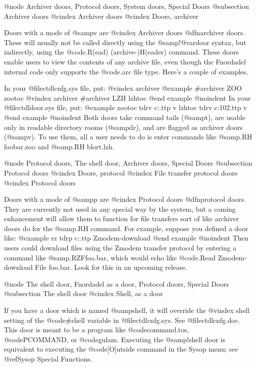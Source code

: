 {@node Archiver doors, Protocol doors, System doors, Special Doors
@subsection Archiver doors
@cindex Archiver doors
@cindex Doors, archiver

Doors with a mode of @samp{v} are
@cindex Archiver doors
@dfn{archiver} doors.  These will usually
not be called directly using the @samp{!@var{door}} syntax, but indirectly,
using the @code{.R(ead) (archive-)H(eader)} command.  These doors enable
users to view the contents of any archive file, even though the
Fnordadel internal code only supports the @code{.arc} file type.  Here's
a couple of examples.

In your @file{ctdlcnfg.sys} file, put:
@vindex archiver
@example
#archiver ZOO zootoc
@vindex archiver
#archiver LZH lzhtoc
@end example
@noindent
In your @file{ctdldoor.sys} file, put:
@example
zootoc  tdrv    c:\bin\zoo.ttp          v
lzhtoc  tdrv    c:\bin\lharc102.ttp     v
@end example
@noindent
Both doors take command tails (@samp{t}), are usable only in readable
directory rooms (@samp{dr}), and are flagged as archiver doors (@samp{v}).
To use them, all a user needs to do is enter commands like
@samp{.RH foobar.zoo} and @samp{.RH blort.lzh}.

@node Protocol doors, The shell door, Archiver doors, Special Doors
@subsection Protocol doors
@cindex Doors, protocol
@cindex File transfer protocol doors
@cindex Protocol doors

Doors with a mode of @samp{p} are
@cindex Protocol doors
@dfn{protocol} doors.  They are currently
not used in any special way by the system, but a coming enhancement
will allow them to function for file transfers sort of like archiver
doors do for the @samp{.RH} command.  For example, suppose you defined a
door like:
@example
rz      tdrp    c:\bin\rz.ttp   Zmodem-download
@end example
@noindent
Then users could download files using the Zmodem transfer protocol by
entering a command like @samp{.RZFfoo.bar}, which would echo like
@code{.Read Zmodem-download File foo.bar}.  Look
for this in an upcoming release.

@node The shell door, Fnordadel as a door, Protocol doors, Special Doors
@subsection The shell door
@cindex Shell, as a door

If you have a door which is named @samp{shell}, it will override the
@vindex shell
setting of the @code{#shell} variable in @file{ctdlcnfg.sys}.  See
@file{ctdlcnfg.doc}.
This door is meant to be a program like @code{command.tos}, @code{PCOMMAND}, or
@code{gulam}.  Executing the @samp{!shell} door is equivalent to executing the
@code{[O]utside} command in the Sysop menu; see @ref{Sysop Special Functions}.

}
